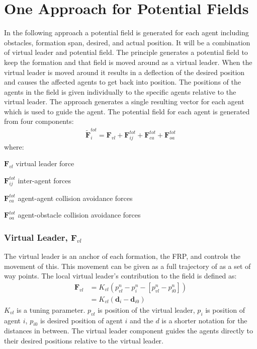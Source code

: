 \section{One Approach for Potential Fields}
\label{sc:one-approach}
In the following approach a potential field is generated for each
agent including obstacles, formation span, desired, and actual
position.  It will be a combination of virtual leader and potential
field. The principle generates a potential field to keep the formation
and that field is moved around as a virtual leader. When the virtual
leader is moved around it results in a deflection of the desired
position and causes the affected agents to get back into position. The
positions of the agents in the field is given individually to the
specific agents relative to the virtual leader. The approach generates
a single resulting vector for each agent which is used to guide the
agent. The potential field for each agent is generated from four
components:
\begin{align}
\tilde{\mathbf{F}}_i^{tot} = \mathbf{F}_{vl}+\mathbf{F}_{ij}^{tot}+\mathbf{F}_{ca}^{tot}+\mathbf{F}_{oa}^{tot}
\end{align}
where:
\begin{ffk}
\firmlist%
\item[$\mathbf{F}_{vl}$] virtual leader force
\item[$\mathbf{F}_{ij}^{tot}$] inter-agent forces
\item[$\mathbf{F}_{ca}^{tot}$] agent-agent collision avoidance forces
\item[$\mathbf{F}_{oa}^{tot}$] agent-obstacle collision avoidance forces
\end{ffk}

\subsubsection{Virtual Leader, $\mathbf{F}_{vl}$}
The virtual leader is an anchor of each formation, the \ac{FRP}, and
controls the movement of this. This movement can be given as a
full trajectory of as a set of way points. The local virtual leader's
contribution to the field is defined as:
\begin{align}
\mathbf{F}_{vl} &= K_{vl}(p_{vl}^n-p_i^n-[p_{vl}^n-p_{i0}^n])\\
&= K_{vl}(\mathbf{d}_i-\mathbf{d}_{i0})
\end{align}
$K_{vl}$ is a tuning parameter. $p_{vl}$ is position of the virtual
leader, $p_i$ is position of agent $i$, $p_{i0}$ is desired position
of agent $i$ and the $d$ is a shorter notation for the distances in
between. The virtual leader component guides the agents directly to
their desired positions relative to the virtual leader.

